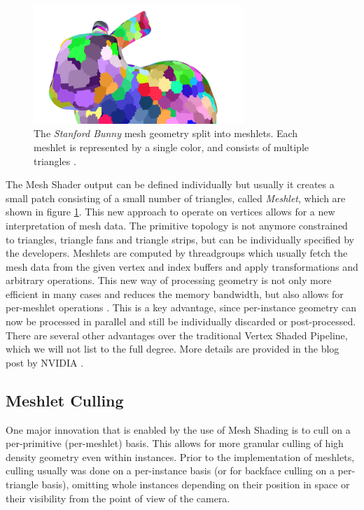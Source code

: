\begin{figure}[h]
    \centering
    \includegraphics[width=300px]{images/graphics/bunny-meshlet.jpg}
    \caption{The \emph{Stanford Bunny} mesh geometry split into meshlets. Each meshlet is represented by a single color, 
    and consists of multiple triangles \cite{Oberberger2024}.}
    \label{fig:bunny-meshlet}
\end{figure}

\noindent
The Mesh Shader output can be defined individually but usually it creates a small patch consisting of a small 
number of triangles, called \emph{Meshlet}, which are shown in figure \ref{fig:bunny-meshlet}. This new approach 
to operate on vertices allows for a new interpretation of mesh data. The primitive topology is not anymore constrained 
to triangles, triangle fans and triangle strips, but can be individually specified by the developers.
Meshlets are computed by threadgroups which usually fetch the mesh data from the given vertex and index buffers and 
apply transformations and arbitrary operations. This new way of processing geometry is not only more efficient in many 
cases and reduces the memory bandwidth, but also allows for per-meshlet operations \cite{Kubisch2020}. This is a key 
advantage, since per-instance geometry can now be processed in parallel and still be individually discarded or post-processed. 
There are several other advantages over the traditional Vertex Shaded Pipeline, which we will not list to the full 
degree. More details are provided in the blog post by NVIDIA \cite{Kubisch2020}.\\


\subsection*{Meshlet Culling} \label{subsec-meshlet-culling}

One major innovation that is enabled by the use of Mesh Shading is to cull on a per-primitive (per-meshlet) basis. 
This allows for more granular culling of high density geometry even within instances. Prior to the implementation 
of meshlets, culling usually was done on a per-instance basis (or for backface culling on a per-triangle basis), 
omitting whole instances depending on their position in space or their visibility from the point of view of the camera.\\

